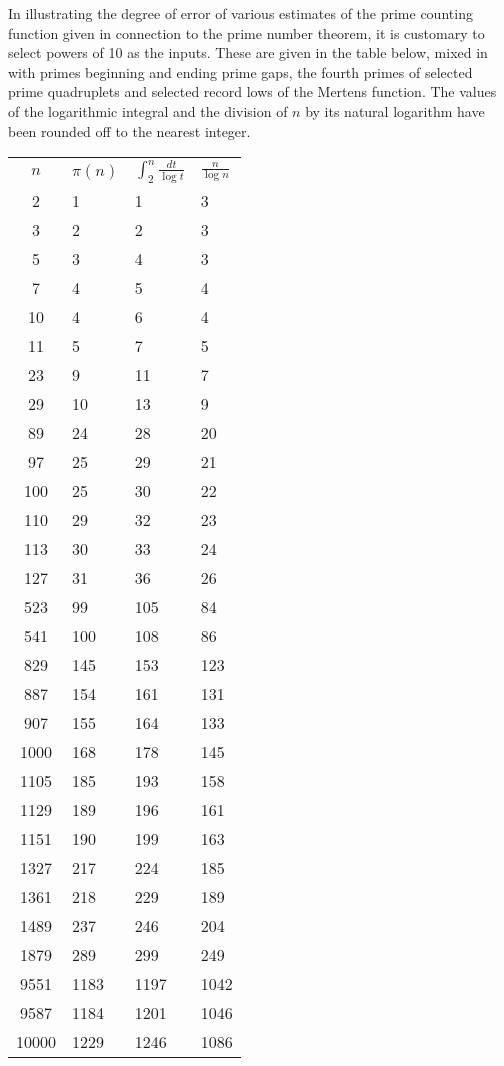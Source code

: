 \documentclass[12pt]{article}
\begin{document}
In illustrating the degree of error of various estimates of the prime counting function given in connection to the prime number theorem, it is customary to select powers of 10 as the inputs. These are given in the table below, mixed in with primes beginning and ending prime gaps, the fourth primes of selected prime quadruplets and selected record lows of the Mertens function. The values of the logarithmic integral and the division of $n$ by its natural logarithm have been rounded off to the nearest integer.

\begin{tabular}{|c|l|l|l|}
$n$ & $\pi(n)$ & $\int_2^n \frac{dt}{\log t}$ & $\frac{n}{\log n}$ \\
2 & 1 & 1 & 3 \\
3 & 2 & 2 & 3 \\
5 & 3 & 4 & 3 \\
7 & 4 & 5 & 4 \\
10 & 4 & 6 & 4 \\
11 & 5 & 7 & 5 \\
23 & 9 & 11 & 7 \\
29 & 10 & 13 & 9 \\
89 & 24 & 28 & 20 \\
97 & 25 & 29 & 21 \\
100 & 25 & 30 & 22 \\
110 & 29 & 32 & 23 \\
113 & 30 & 33 & 24 \\
127 & 31 & 36 & 26 \\
523 & 99 & 105 & 84 \\
541 & 100 & 108 & 86 \\
829 & 145 & 153 & 123 \\
887 & 154 & 161 & 131 \\
907 & 155 & 164 & 133 \\
1000 & 168 & 178 & 145 \\
1105 & 185 & 193 & 158 \\
1129 & 189 & 196 & 161 \\
1151 & 190 & 199 & 163 \\
1327 & 217 & 224 & 185 \\
1361 & 218 & 229 & 189 \\
1489 & 237 & 246 & 204 \\
1879 & 289 & 299 & 249 \\
9551 & 1183 & 1197 & 1042 \\
9587 & 1184 & 1201 & 1046 \\
10000 & 1229 & 1246 & 1086 \\

\end{tabular}
\end{document}
